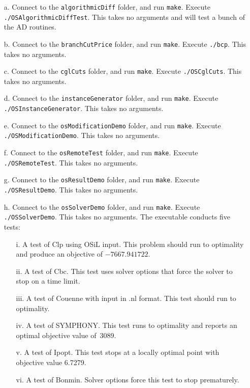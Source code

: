\begin{itemize}
\begin{itemize}
\item[a.]  Connect to the {\tt algorithmicDiff} folder, and run {\tt make}. 
Execute {\tt ./OSAlgorithmicDiffTest}.  
This takes no arguments and will test a bunch of the AD routines.

\item[b.]  Connect to the {\tt branchCutPrice} folder, and run {\tt make}. 
Execute {\tt ./bcp}.  This takes no arguments.

\item[c.]  Connect to the {\tt cglCuts} folder, and run {\tt make}. 
Execute {\tt ./OSCglCuts}.  This takes no arguments.

\item[d.]  Connect to the {\tt instanceGenerator} folder, and run {\tt make}. 
Execute {\tt ./OSInstanceGenerator}.  This takes no arguments.

\item[e.]  Connect to the {\tt osModificationDemo} folder, and run {\tt make}. 
Execute {\tt ./OSModificationDemo}.  This takes no arguments.

\item[f.]  Connect to the {\tt osRemoteTest} folder, and run {\tt make}. 
Execute {\tt ./OSRemoteTest}.  This takes no arguments.

\item[g.]  Connect to the {\tt osResultDemo} folder, and run {\tt make}. 
Execute {\tt ./OSResultDemo}.  This takes no arguments.

\item[h.]  Connect to the {\tt osSolverDemo} folder, and run {\tt make}. 
Execute {\tt ./OSSolverDemo}.  This takes no arguments. The executable conducts five tests:
\begin{itemize}
\item[i.] A test of Clp using OSiL input. This problem should run to optimality and produce an objective of $-7667.941722$.
\item[ii.] A test of Cbc. This test uses solver options that force the solver to stop  on a time limit.
\item[iii.] A test of Couenne with input in .nl format. This test should run to optimality.
\item[iv.] A test of SYMPHONY. This test runs to optimality and reports an optimal objective value of~3089.
\item[v.] A test of Ipopt. This test stops at a locally optimal point with objective value 6.7279.
\item[vi.] A test of Bonmin. Solver options force this test to stop prematurely.
\end{itemize}


\end{itemize}
\end{itemize}
